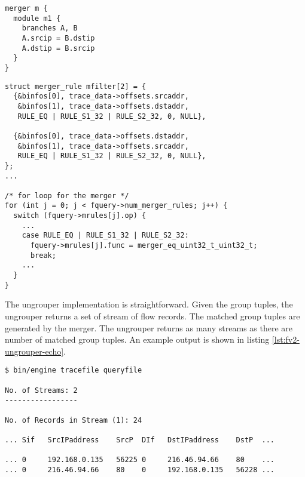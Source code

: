 \begin{lstlisting}
merger m {
  module m1 {
    branches A, B
    A.srcip = B.dstip
    A.dstip = B.srcip
  }
}
\end{lstlisting}

\begin{lstlisting}
struct merger_rule mfilter[2] = {
  {&binfos[0], trace_data->offsets.srcaddr,
   &binfos[1], trace_data->offsets.dstaddr,
   RULE_EQ | RULE_S1_32 | RULE_S2_32, 0, NULL},

  {&binfos[0], trace_data->offsets.dstaddr,
   &binfos[1], trace_data->offsets.srcaddr,
   RULE_EQ | RULE_S1_32 | RULE_S2_32, 0, NULL},
};
...

/* for loop for the merger */
for (int j = 0; j < fquery->num_merger_rules; j++) {
  switch (fquery->mrules[j].op) {
    ...
    case RULE_EQ | RULE_S1_32 | RULE_S2_32:
      fquery->mrules[j].func = merger_eq_uint32_t_uint32_t;
      break;
    ...
  }
}
\end{lstlisting}

The ungrouper implementation is straightforward. Given the group tuples, the
ungrouper  returns a set of stream of
flow records. The matched group tuples are generated by the merger. The
ungrouper returns as many streams as there are number of matched group tuples.
An example output is shown in listing \ref{lst:fv2-ungrouper-echo}.

\begin{lstlisting}
$ bin/engine tracefile queryfile

No. of Streams: 2
-----------------

No. of Records in Stream (1): 24

... Sif   SrcIPaddress    SrcP  DIf   DstIPaddress    DstP  ...

... 0     192.168.0.135   56225 0     216.46.94.66    80    ...
... 0     216.46.94.66    80    0     192.168.0.135   56228 ...
\end{lstlisting}



